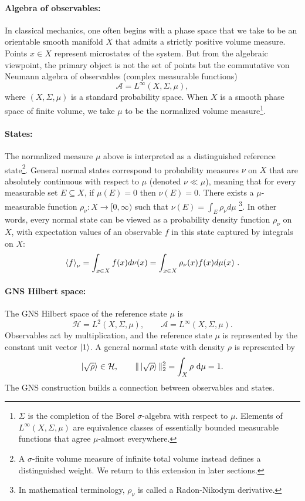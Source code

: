 \documentclass[a4paper,11pt]{article}
\theoremstyle{definition}
\newcommand{\dd}{\,\mathrm{d}}
\newcommand{\cH}{\mathcal{H}}
\newcommand{\mA}{\mathcal{A}}
\begin{document}
\paragraph{Algebra of observables:} In classical mechanics, one often begins with a phase space that we take to be an orientable smooth manifold \(X\) that admits a strictly positive volume measure. Points \(x\in X\) represent microstates of the system. But from the algebraic viewpoint, the primary object is not the set of points but the commutative von Neumann algebra of observables (complex measurable functions)
\[
\mA=L^\infty(X,\Sigma,\mu),
\]
where \((X,\Sigma,\mu)\) is a standard probability space. When $X$ is a smooth phase space of finite volume, we take $\mu$ to be the normalized volume measure\footnote{$\Sigma$ is the completion of the Borel $\sigma$-algebra with respect to $\mu$. Elements of $L^\infty(X,\Sigma,\mu)$ are equivalence classes of essentially bounded measurable functions that agree $\mu$-almost everywhere.}.


\paragraph{States:} The normalized measure $\mu$ above is interpreted as a distinguished reference state\footnote{A $\sigma$-finite volume measure of infinite total volume instead defines a distinguished weight. We return to this extension in later sections.}. General normal states correspond to probability measures $\nu$ on $X$ that are absolutely continuous with respect to $\mu$ (denoted $\nu\ll \mu$), meaning that for every measurable set $E\subseteq X$, if $\mu(E)=0$ then $\nu(E)=0$.
There exists a $\mu$-measurable function $\rho_\nu:X\to [0,\infty)$ such that $\nu(E)=\int_E \rho_\nu d\mu$ \footnote{In mathematical terminology, $\rho_\nu$ is called a Radon-Nikodym derivative.}. In other words, every normal state can be viewed as a probability density function $\rho_\nu$ on $X$, with expectation values of an observable $f$ in this state captured by integrals on $X$: 
\begin{align}
\braket{f}_\nu=\int_{x\in X}f(x) d\nu(x)=\int_{x\in X} \rho_\nu(x) f(x) d\mu(x)\ .
\end{align}

\paragraph{GNS Hilbert space:} The GNS Hilbert space of the reference state $\mu$ is
\[
  \cH=L^2(X,\Sigma,\mu),
  \qquad
  \mA=L^\infty(X,\Sigma,\mu).
\]
Observables act by multiplication, and the reference state $\mu$ is represented by the constant unit vector $\ket{1}$. A general normal state with density $\rho$ is represented by
\[
  \ket{\sqrt{\rho}}\in\cH,
  \qquad
  \|\ket{\sqrt{\rho}}\|_2^2=\int_X\rho\,\dd\mu=1.
\]
The GNS construction builds a connection between observables and states.
\end{document}
